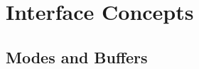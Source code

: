 

\section{Interface Concepts}
\label{sec:interface-concepts}

\subsection{Modes and Buffers}
\label{sec:modes-buffers}


